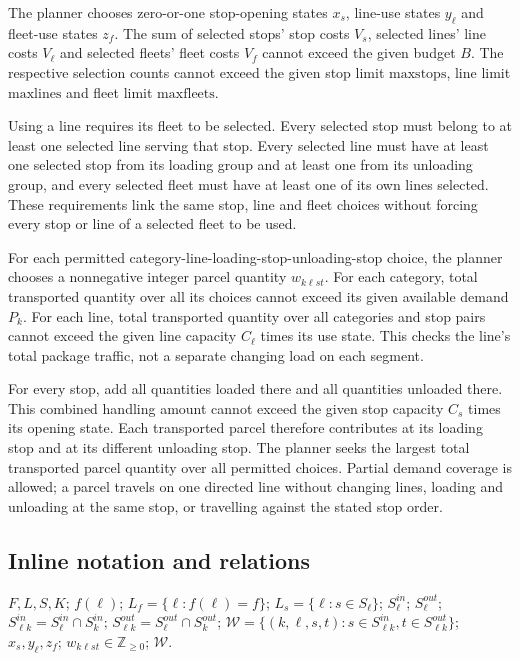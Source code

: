 \documentclass[10pt]{article}
\begin{document}
The planner chooses zero-or-one stop-opening states $x_s$, line-use states $y_\ell$ and fleet-use states $z_f$. The sum of selected stops' stop costs $V_s$, selected lines' line costs $V_\ell$ and selected fleets' fleet costs $V_f$ cannot exceed the given budget $B$. The respective selection counts cannot exceed the given stop limit $\mathrm{maxstops}$, line limit $\mathrm{maxlines}$ and fleet limit $\mathrm{maxfleets}$.

Using a line requires its fleet to be selected. Every selected stop must belong to at least one selected line serving that stop. Every selected line must have at least one selected stop from its loading group and at least one from its unloading group, and every selected fleet must have at least one of its own lines selected. These requirements link the same stop, line and fleet choices without forcing every stop or line of a selected fleet to be used.

For each permitted category-line-loading-stop-unloading-stop choice, the planner chooses a nonnegative integer parcel quantity $w_{k\ell st}$. For each category, total transported quantity over all its choices cannot exceed its given available demand $P_k$. For each line, total transported quantity over all categories and stop pairs cannot exceed the given line capacity $C_\ell$ times its use state. This checks the line's total package traffic, not a separate changing load on each segment.

For every stop, add all quantities loaded there and all quantities unloaded there. This combined handling amount cannot exceed the given stop capacity $C_s$ times its opening state. Each transported parcel therefore contributes at its loading stop and at its different unloading stop. The planner seeks the largest total transported parcel quantity over all permitted choices. Partial demand coverage is allowed; a parcel travels on one directed line without changing lines, loading and unloading at the same stop, or travelling against the stated stop order.

\subsection*{Inline notation and relations}
$F,L,S,K$; $f(\ell)$; $L_f=\{\ell:f(\ell)=f\}$; $L_s=\{\ell:s\in S_\ell\}$; $S_\ell^{in}$; $S_\ell^{out}$; $S_{\ell k}^{in}=S_\ell^{in}\cap S_k^{in}$; $S_{\ell k}^{out}=S_\ell^{out}\cap S_k^{out}$; $\mathcal W=\{(k,\ell,s,t):s\in S_{\ell k}^{in},t\in S_{\ell k}^{out}\}$; $x_s,y_\ell,z_f$; $w_{k\ell st}\in\mathbb Z_{\ge0}$; $\mathcal W$.
\end{document}
